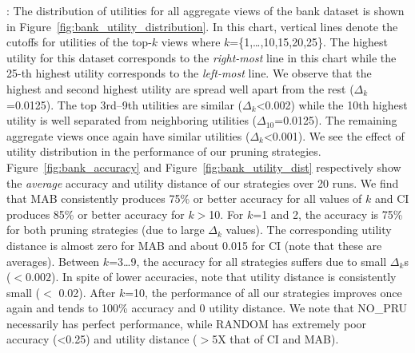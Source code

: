 :
The distribution of utilities for all aggregate views of the bank dataset is
shown in Figure~\ref{fig:bank_utility_distribution}. 
In this chart, vertical lines denote the cutoffs for utilities of the top-$k$ views
where $k$=\{1,\ldots,10,15,20,25\}.
The highest utility for this dataset corresponds to the {\it right-most} line
in this chart while the 25-th highest utility corresponds to the {\it left-most}
line. 
We observe that the highest and second highest utility are spread well apart 
from the rest ($\Delta_k$=0.0125). 
The top 3rd--9th utilities are similar ($\Delta_k$<0.002) while the 10th highest 
utility is well separated from neighboring utilities ($\Delta_{10}$=0.0125).
The remaining aggregate views once again have similar utilities ($\Delta_k$<0.001).
We see the effect of utility distribution in the performance of our pruning 
strategies.
Figure~\ref{fig:bank_accuracy} and Figure~\ref{fig:bank_utility_dist} respectively show
the {\em average} accuracy and utility distance of our strategies over 20 runs.
We find that MAB consistently produces 75\% or better accuracy for all values of $k$ and
CI produces 85\% or better accuracy for $k$$>$10.
For $k$=1 and 2, the accuracy is 75\% for both pruning strategies (due to large 
$\Delta_k$ values).
The corresponding utility distance is almost zero for MAB and about 0.015 for CI (note that these
are averages).
Between $k$=3\ldots9, the accuracy for all strategies suffers due to small $\Delta_k$s ($< 0.002$).
In spite of lower accuracies, note that utility distance is consistently small ($<$ 0.02).
After $k$=10, the performance of all our strategies improves once again and tends to 100\% accuracy and
0 utility distance.
We note that NO\_PRU necessarily has perfect performance, while RANDOM has extremely poor accuracy (<0.25) 
and utility distance ($>$5X that of CI and MAB). 

